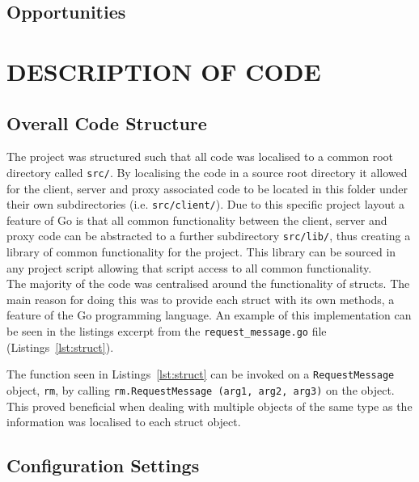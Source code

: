 \documentclass[10pt,twocolumn]{witseiepaper}
\begin{document}
	\subsection{Opportunities}
	
		


\section{DESCRIPTION OF CODE}

	\subsection{Overall Code Structure}

		The project was structured such that all code was localised to a common root directory called \texttt{src/}. By localising the code in a source root directory it allowed for the client, server and proxy associated code to be located in this folder under their own subdirectories (i.e. \texttt{src/client/}). Due to this specific project layout a feature of Go is that all common functionality between the client, server and proxy code can be abstracted to a further subdirectory \texttt{src/lib/}, thus creating a library of common functionality for the project. This library can be sourced in any project script allowing that script access to all common functionality.\\
		
		The majority of the code was centralised around the functionality of structs. The main reason for doing this was to provide each struct with its own methods, a feature of the Go programming language. An example of this implementation can be seen in the listings excerpt from the \texttt{request\_message.go} file (Listings~\ref{lst:struct}). 
		
		
		
		The function seen in Listings~\ref{lst:struct} can be invoked on a \texttt{RequestMessage} object, \texttt{rm}, by calling \texttt{rm.RequestMessage (arg1, arg2, arg3)} on the object. This proved beneficial when dealing with multiple objects of the same type as the information was localised to each struct object. \\
		
	\subsection{Configuration Settings}
		
\end{document}
